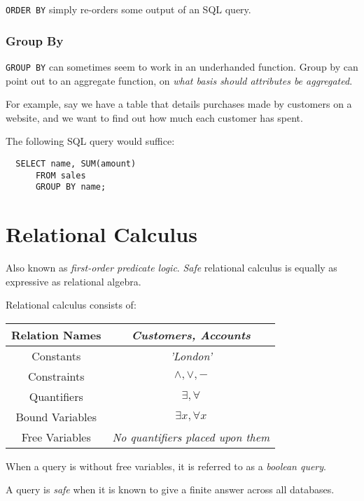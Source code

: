 \documentclass{article}
\begin{document}
\texttt{ORDER BY} simply re-orders some output of an SQL query. 

\subsubsection{Group By}

\texttt{GROUP BY} can sometimes seem to work in an underhanded function. Group by can point out to an aggregate function, on \textit{what basis should attributes be aggregated}.

For example, say we have a table that details purchases made by customers on a website, and we want to find out how much each customer has spent.

The following SQL query would suffice:

\begin{lstlisting}
  SELECT name, SUM(amount)
      FROM sales
      GROUP BY name;
\end{lstlisting}

\section{Relational Calculus}

Also known as \textit{first-order predicate logic}. \textit{Safe} relational calculus is equally as expressive as relational algebra.

Relational calculus consists of:

\begin{center}
  \begin{tabular}{|c|c|}
    \hline
    Relation Names & \textit{Customers, Accounts}\\
    \hline
    Constants & \textit{'London'}\\
    \hline
    Constraints & $\wedge, \vee, -$\\
    \hline
    Quantifiers & $\exists, \forall$\\
    \hline
    Bound Variables & $\exists x, \forall x$\\
    \hline
    Free Variables & \textit{No quantifiers placed upon them}\\
    \hline
  \end{tabular}
\end{center}

When a query is without free variables, it is referred to as a \textit{boolean query}.

A query is \textit{safe} when it is known to give a finite answer across all databases.
\end{document}
